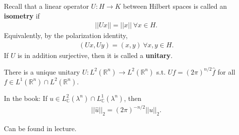 Recall that a linear operator \(U:H\rightarrow K\) between Hilbert spaces is called an \textbf{isometry} if 
\begin{align*}
    ||Ux|| = ||x|| \ \forall x\in H.
\end{align*}
Equivalently, by the polarization identity, 
\begin{align*}
    (Ux,Uy) = (x,y) \ \forall x,y\in H.
\end{align*}
If \(U\) is in addition surjective, then it is called a \textbf{unitary}.
\begin{theorem}[Plancherel]
    There is a unique unitary \(U:L^2(\mathbb{R}^n)\rightarrow L^2(\mathbb{R}^n)\) s.t. \(Uf=(2\pi)^{n/2} \hat{f}\) for all \(f\in L^1(\mathbb{R}^n)\cap L^2(\mathbb{R}^n)\). 

    In the book: If \(u\in L^2_{\mathbb{C}}(\lambda^n)\cap L^{1}_{\mathbb{C}}(\lambda^n)\), then 
    \begin{align*}
        ||\hat{u}||_2 = (2\pi)^{-n/2}||u||_2.
    \end{align*}
\end{theorem}
\ifdetailed 
Can be found in lecture.
\fi 